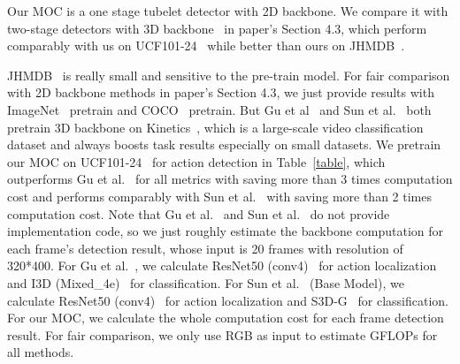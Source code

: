 \documentclass[runningheads]{llncs}
\begin{document}
Our MOC is a one stage tubelet detector with 2D backbone. We compare it with two-stage detectors with 3D backbone~\cite{gu2018ava,SunSVMSS18} in paper’s Section 4.3, which perform comparably with us on UCF101-24~\cite{UCF101} while better than ours on JHMDB~\cite{JHMDB}.


JHMDB~\cite{JHMDB} is really small and sensitive to the pre-train model. For fair comparison with 2D backbone methods in paper's Section 4.3, we just provide results with ImageNet~\cite{deng2009imagenet} pretrain and COCO~\cite{lin2014microsoft} pretrain. But Gu et al~\cite{gu2018ava} and Sun et al.~\cite{SunSVMSS18} both pretrain 3D backbone on Kinetics~\cite{carreira2017quo}, which is a large-scale video classification dataset and always boosts task results especially on small datasets. We pretrain our MOC on UCF101-24~\cite{UCF101} for action detection in Table~\ref{table}, which outperforms Gu et al.~\cite{gu2018ava} for all metrics with saving more than 3 times computation cost and performs comparably with Sun et al.~\cite{SunSVMSS18} with saving more than 2 times computation cost. Note that Gu et al.~\cite{gu2018ava} and Sun et al.~\cite{SunSVMSS18} do not provide implementation code, so we just roughly estimate the backbone computation for each frame's detection result, whose input is 20 frames with resolution of 320*400. For Gu et al.~\cite{gu2018ava}, we calculate ResNet50 (conv4)~\cite{he2016deep} for action localization and I3D (Mixed\_4e)~\cite{carreira2017quo} for classification. For Sun et al.~\cite{SunSVMSS18} (Base Model), we calculate ResNet50 (conv4)~\cite{he2016deep} for action localization and S3D-G~\cite{xie2018rethinking} for classification. For our MOC, we calculate the whole computation cost for each frame detection result. For fair comparison, we only use RGB as input to estimate GFLOPs for all methods.



\end{document}
